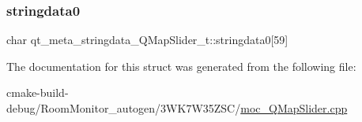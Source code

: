 \subsubsection{\texorpdfstring{stringdata0}{stringdata0}}
{\footnotesize\ttfamily char qt\+\_\+meta\+\_\+stringdata\+\_\+\+Q\+Map\+Slider\+\_\+t\+::stringdata0\mbox{[}59\mbox{]}}



The documentation for this struct was generated from the following file\+:\begin{DoxyCompactItemize}
\item 
cmake-\/build-\/debug/\+Room\+Monitor\+\_\+autogen/3\+W\+K7\+W35\+Z\+S\+C/\hyperlink{moc___q_map_slider_8cpp}{moc\+\_\+\+Q\+Map\+Slider.\+cpp}\end{DoxyCompactItemize}
